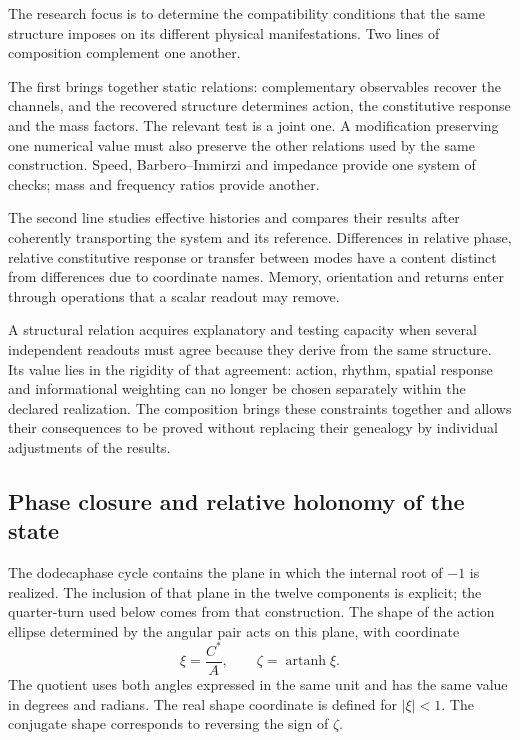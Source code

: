 The research focus is to determine the compatibility conditions
that the same structure imposes on its different
physical manifestations. Two lines of composition complement one another.

The first brings together static relations: complementary observables
recover the channels, and the recovered structure determines action,
the constitutive response and the mass factors. The relevant test
is a joint one. A modification preserving one numerical value must also preserve
the other relations used by the same construction. Speed,
Barbero--Immirzi and impedance provide one system of checks;
mass and frequency ratios provide another.

The second line studies effective histories and compares their results
after coherently transporting the system and its reference. Differences
in relative phase, relative constitutive response or transfer
between modes have a content distinct from differences due to
coordinate names. Memory, orientation and returns
enter through operations that a scalar readout may remove.

A structural relation acquires explanatory and testing capacity
when several independent readouts must agree because they derive from the
same structure. Its value lies in the rigidity of that agreement:
action, rhythm, spatial response and informational weighting can no longer
be chosen separately within the declared realization. The
composition brings these constraints together and allows their consequences to be proved
without replacing their genealogy by individual adjustments of the results.

\subsection{Phase closure and relative holonomy of the state}
\label{subsec:narrativa-holonomia-relativa}

The dodecaphase cycle contains the plane in which the internal root
of $-1$ is realized. The inclusion of that plane in the twelve components is
explicit; the quarter-turn used below comes from that
construction. The shape of the action ellipse determined by the
angular pair acts on this plane, with coordinate
\begin{equation}
 \xi=\frac{C^*}{A},\qquad
 \zeta=\operatorname{artanh}\xi.
 \label{eq:narrativa-coordenada-forma}
\end{equation}
The quotient uses both angles expressed in the same unit and has
the same value in degrees and radians. The real shape coordinate is
defined for $|\xi|<1$. The conjugate shape corresponds to
reversing the sign of $\zeta$.

